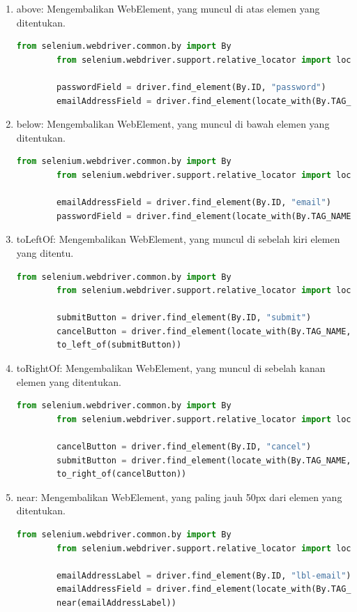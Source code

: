 \begin{enumerate}
	\item above: Mengembalikan WebElement, yang muncul di atas elemen yang ditentukan.
	\begin{lstlisting}[language=python, caption=Contoh kode Pencari Relatif Above, label=kode:2:above]
		from selenium.webdriver.common.by import By
		from selenium.webdriver.support.relative_locator import locate_with
		
		passwordField = driver.find_element(By.ID, "password")
		emailAddressField = driver.find_element(locate_with(By.TAG_NAME, "input").above(passwordField))
	\end{lstlisting}
	\item below: Mengembalikan WebElement, yang muncul di bawah elemen yang ditentukan.
	\begin{lstlisting}[language=python, caption=Contoh kode Pencari Relatif Below, label=kode:2:below]
		from selenium.webdriver.common.by import By
		from selenium.webdriver.support.relative_locator import locate_with
		
		emailAddressField = driver.find_element(By.ID, "email")
		passwordField = driver.find_element(locate_with(By.TAG_NAME, "input").below(emailAddressField))
	\end{lstlisting}
	\item toLeftOf: Mengembalikan WebElement, yang muncul di sebelah kiri elemen yang ditentu.
	\begin{lstlisting}[language=python, caption=Contoh kode Pencari Relatif toLeftOf, label=kode:2:left]
		from selenium.webdriver.common.by import By
		from selenium.webdriver.support.relative_locator import locate_with
		
		submitButton = driver.find_element(By.ID, "submit")
		cancelButton = driver.find_element(locate_with(By.TAG_NAME, "button").
		to_left_of(submitButton))
	\end{lstlisting}
	\item toRightOf: Mengembalikan WebElement, yang muncul di sebelah kanan elemen yang ditentukan.
	\begin{lstlisting}[language=python, caption=Contoh kode Pencari Relatif toRightOf, label=kode:2:right]
		from selenium.webdriver.common.by import By
		from selenium.webdriver.support.relative_locator import locate_with
		
		cancelButton = driver.find_element(By.ID, "cancel")
		submitButton = driver.find_element(locate_with(By.TAG_NAME, "button").
		to_right_of(cancelButton))
	\end{lstlisting}
	\item near: Mengembalikan WebElement, yang paling jauh 50px dari elemen yang ditentukan.
	\begin{lstlisting}[language=python, caption=Contoh kode Pencari Relatif Near, label=kode:2:near]
		from selenium.webdriver.common.by import By
		from selenium.webdriver.support.relative_locator import locate_with
		
		emailAddressLabel = driver.find_element(By.ID, "lbl-email")
		emailAddressField = driver.find_element(locate_with(By.TAG_NAME, "input").
		near(emailAddressLabel))
	\end{lstlisting}
\end{enumerate}	

